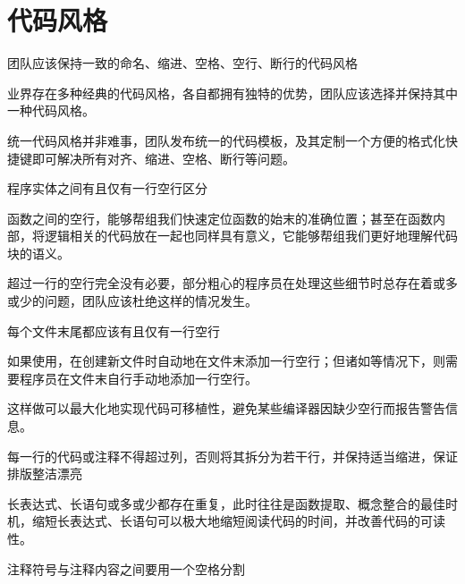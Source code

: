 \section{代码风格}

\begin{content}

\begin{regulation}
团队应该保持一致的命名、缩进、空格、空行、断行的代码风格
\end{regulation}

业界存在多种经典的代码风格，各自都拥有独特的优势，团队应该选择并保持其中一种代码风格。

\begin{enum}
\end{enum}

统一代码风格并非难事，团队发布统一的代码模板，及其定制一个方便的格式化快捷键即可解决所有对齐、缩进、空格、断行等问题。

\begin{regulation}
程序实体之间有且仅有一行空行区分
\end{regulation}

函数之间的空行，能够帮组我们快速定位函数的始末的准确位置；甚至在函数内部，将逻辑相关的代码放在一起也同样具有意义，它能够帮组我们更好地理解代码块的语义。

超过一行的空行完全没有必要，部分粗心的程序员在处理这些细节时总存在着或多或少的问题，团队应该杜绝这样的情况发生。

\begin{regulation}
每个文件末尾都应该有且仅有一行空行
\end{regulation}

如果使用，在创建新文件时自动地在文件末添加一行空行；但诸如等情况下，则需要程序员在文件末自行手动地添加一行空行。

这样做可以最大化地实现代码可移植性，避免某些编译器因缺少空行而报告警告信息。

\begin{regulation}
每一行的代码或注释不得超过列，否则将其拆分为若干行，并保持适当缩进，保证排版整洁漂亮
\end{regulation}

长表达式、长语句或多或少都存在重复，此时往往是函数提取、概念整合的最佳时机，缩短长表达式、长语句可以极大地缩短阅读代码的时间，并改善代码的可读性。

\begin{regulation}
注释符号与注释内容之间要用一个空格分割
\end{regulation}


\end{content}
